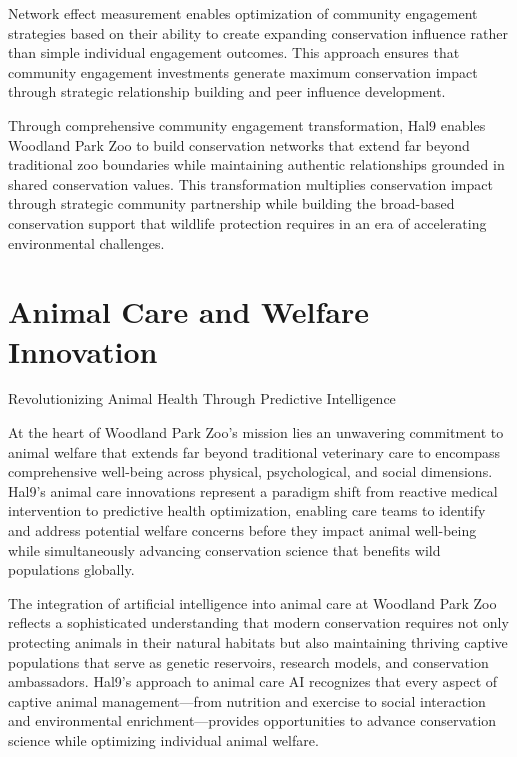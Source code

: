 \documentclass[
  Letterpaper,
]{scrbook}
\begin{document}
Network effect measurement enables optimization of community engagement
strategies based on their ability to create expanding conservation
influence rather than simple individual engagement outcomes. This
approach ensures that community engagement investments generate maximum
conservation impact through strategic relationship building and peer
influence development.

Through comprehensive community engagement transformation, Hal9 enables
Woodland Park Zoo to build conservation networks that extend far beyond
traditional zoo boundaries while maintaining authentic relationships
grounded in shared conservation values. This transformation multiplies
conservation impact through strategic community partnership while
building the broad-based conservation support that wildlife protection
requires in an era of accelerating environmental challenges.


\chapter{Animal Care and Welfare
Innovation}\label{animal-care-and-welfare-innovation}

Revolutionizing Animal Health Through Predictive Intelligence

\hfill\break

At the heart of Woodland Park Zoo's mission lies an unwavering
commitment to animal welfare that extends far beyond traditional
veterinary care to encompass comprehensive well-being across physical,
psychological, and social dimensions. Hal9's animal care innovations
represent a paradigm shift from reactive medical intervention to
predictive health optimization, enabling care teams to identify and
address potential welfare concerns before they impact animal well-being
while simultaneously advancing conservation science that benefits wild
populations globally.

The integration of artificial intelligence into animal care at Woodland
Park Zoo reflects a sophisticated understanding that modern conservation
requires not only protecting animals in their natural habitats but also
maintaining thriving captive populations that serve as genetic
reservoirs, research models, and conservation ambassadors. Hal9's
approach to animal care AI recognizes that every aspect of captive
animal management---from nutrition and exercise to social interaction
and environmental enrichment---provides opportunities to advance
conservation science while optimizing individual animal welfare.
\end{document}
